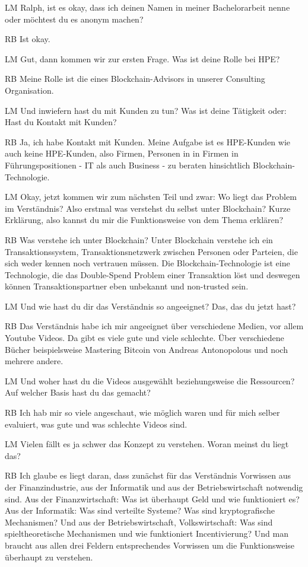 \begin{xlist}
     \item[LM] Ralph, ist es okay, dass ich deinen Namen in meiner Bachelorarbeit nenne oder möchtest du es anonym machen?
 \item[RB] Ist okay.
 \item[LM] Gut, dann kommen wir zur ersten Frage. Was ist deine Rolle bei HPE?
 \item[RB] Meine Rolle ist die eines Blockchain-Advisors in unserer Consulting Organisation.
 \item[LM] Und inwiefern hast du mit Kunden zu tun? Was ist deine Tätigkeit oder: Hast du Kontakt mit Kunden?
 \item[RB] Ja, ich habe Kontakt mit Kunden. Meine Aufgabe ist es HPE-Kunden wie auch keine HPE-Kunden, also Firmen, Personen in in Firmen in Führungspositionen - IT als auch Business - zu beraten hinsichtlich Blockchain-Technologie.
 \item[LM]Okay, jetzt kommen wir zum nächsten Teil und zwar: Wo liegt das Problem im Verständnis? Also erstmal was verstehst du selbst unter Blockchain? Kurze Erklärung, also kannst du mir die Funktionsweise von dem Thema erklären?
 \item[RB] Was verstehe ich unter Blockchain? Unter Blockchain verstehe ich ein Transaktionssystem, Transaktionsnetzwerk zwischen Personen oder Parteien, die sich weder kennen noch vertrauen müssen. Die Blockchain-Technologie ist eine Technologie, die das Double-Spend Problem einer Transaktion löst und deswegen können Transaktionspartner eben unbekannt und non-trusted sein.
 \item[LM] Und wie hast du dir das Verständnis so angeeignet? Das, das du jetzt hast?
 \item[RB] Das Verständnis habe ich mir angeeignet über verschiedene Medien, vor allem Youtube Videos. Da gibt es viele gute und viele schlechte. Über verschiedene Bücher beispielsweise Mastering Bitcoin von Andreas Antonopolous und noch mehrere andere.
 \item[LM] Und woher hast du die Videos ausgewählt beziehungsweise die Ressourcen? Auf welcher Basis hast du das gemacht?
 \item[RB] Ich hab mir so viele angeschaut, wie möglich waren und für mich selber evaluiert, was gute und was schlechte Videos sind.
 \item[LM] Vielen fällt es ja schwer das Konzept zu verstehen. Woran meinst du liegt das? 
 \item[RB] Ich glaube es liegt daran, dass zunächst für das Verständnis Vorwissen aus der Finanzindustrie, aus der Informatik und aus der Betriebswirtschaft notwendig sind. Aus der Finanzwirtschaft: Was ist überhaupt Geld und wie funktioniert es? Aus der Informatik: Was sind verteilte Systeme? Was sind kryptografische Mechanismen? Und aus der Betriebswirtschaft, Volkswirtschaft: Was sind spieltheoretische Mechanismen und wie funktioniert Incentivierung? Und man braucht aus allen drei Feldern entsprechendes Vorwissen um die Funktionsweise überhaupt zu verstehen.

\end{xlist}
